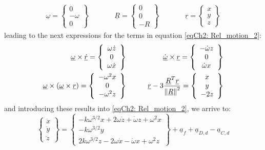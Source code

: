 	\begin{align}
	\underline{\omega} = 
	\left\{ \begin{array}{c}
	0 \\
	-\omega \\
	0
	\end{array}\right\} 
	& \qquad &
	\underline{R} = 
	\left\{ \begin{array}{c}
	0 \\
	0 \\
	-R
	\end{array}\right\} 
	& \qquad &
	\underline{r} = 
	\left\{ \begin{array}{c}
	x \\
	y \\
	z
	\end{array}\right\} 
	\end{align}
	\noindent leading to the next expressions for the terms in equation \eqref{eqCh2: 	Rel_motion_2}:
	\begin{align*}
	\underline{\omega}\times \underline{\dot{r}} = 
	\left\{ \begin{array}{c}
	\omega \dot{z} \\
	0 \\
	\omega \dot{x}
	\end{array}\right\} 
	& \qquad &
	\underline{\dot{\omega}} \times \underline{r} = 
	\left\{ \begin{array}{c}
	-\dot{\omega} z\\
	0 \\
	\dot{\omega} x
	\end{array}\right\} 
	\\
	\underline{\omega}\times\left(\underline{\omega} \times\underline{r}\right) = 
	\left\{ \begin{array}{c}
	- \omega^2 x \\
	0 \\
	- \omega^2 z 
	\end{array}\right\} 
	& \qquad &
	\underline{r} - 3 \dfrac{\underline{R}^T \underline{r}}{\mbox{$\left\lVert \underline{R} \right\rVert$}^2} = 
	\left\{ \begin{array}{c}
	x \\
	y \\
	- 2 z 
	\end{array}\right\} 
	\end{align*}
	\noindent and introducing these results into \eqref{eqCh2: 	Rel_motion_2}, we arrive to:
	\begin{equation}
	\left\{
	\begin{array}{c}
	\ddot{x}\\
	\ddot{y}\\
	\ddot{z}
	\end{array}\right\}
	= 
	\left\{
	\begin{array}{c}
	- k \omega^{3/2} x + 2\omega \dot{z} + \dot{\omega} z + \omega^2 x	\\
	-k \omega^{3/2} y \\
	2k\omega^{3/2} z - 2 \omega \dot{x} - \dot{\omega} x + \omega^2 z
	\end{array}\right\}
	+ \underline{a}_f + \underline{a}_{D, d} - \underline{a}_{C, d}
	\label{eqCh2: Diff_eqs_prox}
	\end{equation}
